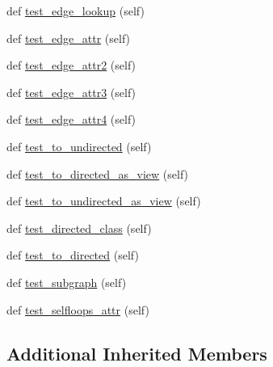 \begin{DoxyCompactItemize}
\item 
def \hyperlink{classnetworkx_1_1classes_1_1tests_1_1test__graph_1_1BaseAttrGraphTester_a0140d7bc28b1c024f05171d306c922e2}{test\+\_\+edge\+\_\+lookup} (self)
\item 
def \hyperlink{classnetworkx_1_1classes_1_1tests_1_1test__graph_1_1BaseAttrGraphTester_aeaf477f55c40e97ec174f8d4e687c62e}{test\+\_\+edge\+\_\+attr} (self)
\item 
def \hyperlink{classnetworkx_1_1classes_1_1tests_1_1test__graph_1_1BaseAttrGraphTester_a2cc2743298ec019d700e481b4f654eb6}{test\+\_\+edge\+\_\+attr2} (self)
\item 
def \hyperlink{classnetworkx_1_1classes_1_1tests_1_1test__graph_1_1BaseAttrGraphTester_a2d5860592b5d7c6fd6e899f1517cf3aa}{test\+\_\+edge\+\_\+attr3} (self)
\item 
def \hyperlink{classnetworkx_1_1classes_1_1tests_1_1test__graph_1_1BaseAttrGraphTester_ae73c6f8b25c8487961a219d56f1395fd}{test\+\_\+edge\+\_\+attr4} (self)
\item 
def \hyperlink{classnetworkx_1_1classes_1_1tests_1_1test__graph_1_1BaseAttrGraphTester_a48947d8814f1f501de418a6b09e620ab}{test\+\_\+to\+\_\+undirected} (self)
\item 
def \hyperlink{classnetworkx_1_1classes_1_1tests_1_1test__graph_1_1BaseAttrGraphTester_a60a7c8c59a78c983cbf07e456125cb43}{test\+\_\+to\+\_\+directed\+\_\+as\+\_\+view} (self)
\item 
def \hyperlink{classnetworkx_1_1classes_1_1tests_1_1test__graph_1_1BaseAttrGraphTester_ab4b8daf49ea1d9fc375d70f8f90c0382}{test\+\_\+to\+\_\+undirected\+\_\+as\+\_\+view} (self)
\item 
def \hyperlink{classnetworkx_1_1classes_1_1tests_1_1test__graph_1_1BaseAttrGraphTester_a4368f70c93a6decc512f71f5854f72d9}{test\+\_\+directed\+\_\+class} (self)
\item 
def \hyperlink{classnetworkx_1_1classes_1_1tests_1_1test__graph_1_1BaseAttrGraphTester_a4416028723e7ebb05db588604eab5aef}{test\+\_\+to\+\_\+directed} (self)
\item 
def \hyperlink{classnetworkx_1_1classes_1_1tests_1_1test__graph_1_1BaseAttrGraphTester_a3cc9b8a15958e24c25efce857da514e1}{test\+\_\+subgraph} (self)
\item 
def \hyperlink{classnetworkx_1_1classes_1_1tests_1_1test__graph_1_1BaseAttrGraphTester_a4c7139af7d4ac22a5ac5e7a916cb623d}{test\+\_\+selfloops\+\_\+attr} (self)
\end{DoxyCompactItemize}
\subsection*{Additional Inherited Members}


